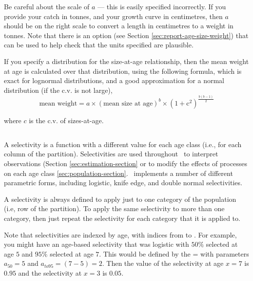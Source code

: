 Be careful about the scale of $a$ --- this is easily specified incorrectly. If you provide your catch in tonnes, and your growth curve in centimetres, then $a$ should be on the right scale to convert a length in centimetres to a weight in tonnes. Note that there is an option  (see Section \ref{sec:report-age-size-weight}) that can be used to help check that the units specified are plausible.

If you specify a distribution for the size-at-age relationship, then the mean weight at age is calculated over that distribution, using the following formula, which is exact for lognormal distributions, and a good approximation for a normal distribution (if the c.v. is not large),
\begin{equation}
	\text{mean weight}=a \times (\text{mean size at age})^b \times \left( 1+\text{c}^2 \right)^{\frac{b(b-1)}{2}}
\end{equation}

where $c$ is the c.v. of sizes-at-age.

\TODOend

\subsection{\label{sec:selectivities}}

A selectivity is a function with a different value for each age class (i.e., for each column of the partition). Selectivities are used throughout \SPM\ to interpret observations (Section \ref{sec:estimation-section} or to modify the effects of processes on each age class \ref{sec:population-section}. \SPM\ implements a number of different parametric forms, including logistic, knife edge, and double normal selectivities.

A selectivity is always defined to apply just to one category of the population (i.e, row of the partition). To apply the same selectivity to more than one category, then just repeat the selectivity for each category that it is applied to.

Note that selectivities are indexed by age, with indices from  to . For example, you might have an age-based selectivity that was logistic with $50\%$ selected at age $5$ and $95\%$ selected at age $7$. This would be defined by the = with parameters $a_{50}=5$ and $a_{to95}=(7-5)=2$. Then the value of the selectivity at age $x=7$ is $0.95$ and the selectivity at $x=3$ is $0.05$.

